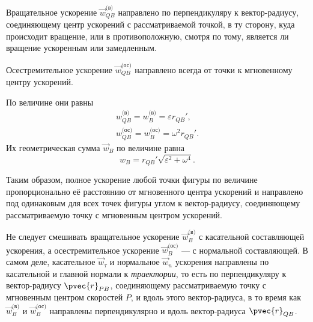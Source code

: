 Вращательное ускорение $\vec{w}_{QB}^\text{(в)}$ направлено по перпендикуляру к
вектор-радиусу, соединяющему центр ускорений с рассматриваемой точкой, в ту
сторону, куда происходит вращение, или в противоположную, смотря по тому,
является ли вращение ускоренным или замедленным.

Осестремительное ускорение $\vec{w}_{QB}^\text{(ос)}$ направлено всегда от точки
к мгновенному центру ускорений.

\begin{figure}[H]
  \centering

  \caption{}
  \label{fig:18_3}
\end{figure}

По величине они равны
\begin{equation*}
  \begin{gathered}
    w_{QB}^\text{(в)} = w_B^\text{(в)} = \varepsilon r_{QB}', \\
    w_{QB}^\text{(ос)} = w_B^\text{(ос)} = \omega^2 r_{QB}'.
  \end{gathered}
\end{equation*}
Их геометрическая сумма $\vec{w}_B$ по величине равна
\begin{equation*}
  w_B = r_{QB}' \sqrt{\varepsilon^2 + \omega^4}.
\end{equation*}

Таким образом, полное ускорение любой точки фигуры по величине пропорционально
её расстоянию от мгновенного центра ускорений и направлено под одинаковым для
всех точек фигуры углом к вектор-радиусу, соединяющему рассматриваемую точку с
мгновенным центром ускорений.

Не следует смешивать вращательное ускорение $\vec{w}_B^\text{(в)}$ с касательной
составляющей ускорения, а осестремительное ускорение $\vec{w}_B^\text{(ос)}$ ---
с нормальной составляющей. В самом деле, касательное $\vec{w}_\tau$ и нормальное
$\vec{w}_n$ ускорения направлены по касательной и главной нормали к
\textit{траектории}, то есть по перпендикуляру к вектор-радиусу $\pvec{r}_{PB}$,
соединяющему рассматриваемую точку с мгновенным центром скоростей $P$, и вдоль
этого вектор-радиуса, в то время как $\vec{w}_B^\text{(в)}$ и
$\vec{w}_B^\text{(ос)}$ направлены перпендикулярно и вдоль вектор-радиуса
$\pvec{r}_{QB}$.

